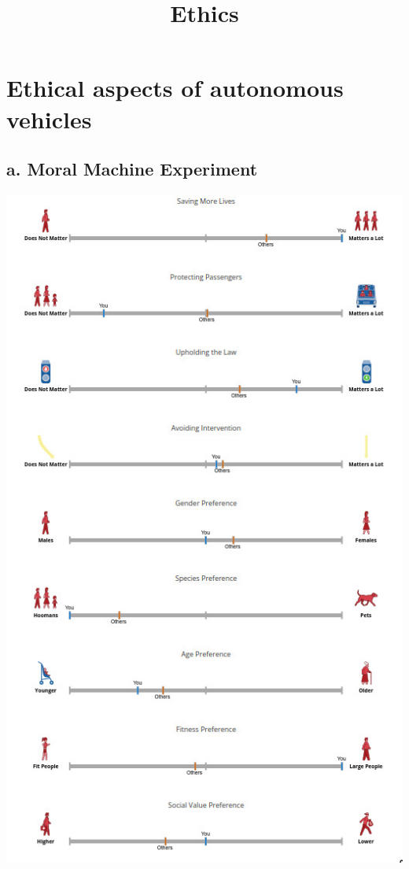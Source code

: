 \documentclass[english]{report}
\begin{document}
\title{Ethics}

\maketitle

\chapter*{Ethical aspects of autonomous vehicles}
\section*{a. Moral Machine Experiment}

\begin{center}
  \includegraphics[scale=0.4]{results.jpeg}
\end{center}
\end{document}

